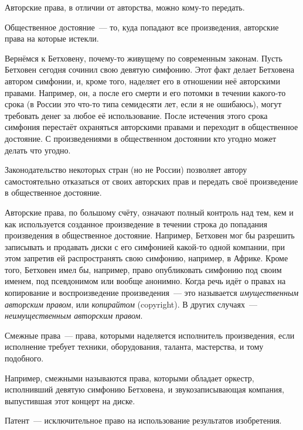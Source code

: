 Авторские права, в отличии от авторства, можно кому-то передать.

\begin{definition}
Общественное достояние~--- то, куда попадают все произведения, авторские права на которые истекли.
\end{definition}

Вернёмся к Бетховену, почему-то живущему по современным законам.
Пусть Бетховен сегодня сочинил свою девятую симфонию.
Этот факт делает Бетховена автором симфонии, и, кроме того, наделяет его в отношении неё авторскими правами.
Например, он, а после его смерти и его потомки в течении какого-то срока (в России это что-то типа семидесяти лет, если я не ошибаюсь), могут требовать денег за любое её использование.
После истечения этого срока симфония перестаёт охраняться авторскими правами и переходит в общественное достояние.
С произведениями в общественном достоянии кто угодно может делать что угодно.

Законодательство некоторых стран (но не России) позволяет автору самостоятельно отказаться от своих авторских прав и передать своё произведение в общественное достояние.

Авторские права, по большому счёту, означают полный контроль над тем, кем и как используется созданное произведение в течении строка до попадания произведения в общественное достояние.
Например, Бетховен мог бы разрешить записывать и продавать диски с его симфонией какой-то одной компании, при этом запретив ей распространять свою симфонию, например, в Африке.
Кроме того, Бетховен имел бы, например, право опубликовать симфонию под своим именем, под псевдонимом или вообще анонимно.
Когда речь идёт о правах на копирование и воспроизведение произведения~--- это называется \emph{имущественным авторским правом}, или \emph{копирайтом} (copyright). В других случаях~--- \emph{неимущественным авторским правом}.

\begin{definition}
Смежные права~--- права, которыми наделяется исполнитель произведения, если исполнение требует техники, оборудования, таланта, мастерства, и тому подобного.
\end{definition}

Например, смежными называются права, которыми обладает оркестр, исполнивший девятую симфонию Бетховена, и звукозаписывающая компания, выпустившая этот концерт на диске.

\begin{definition}
Патент~--- исключительное право на использование результатов изобретения.
\end{definition}

